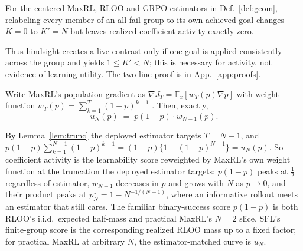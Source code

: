 \begin{lemma}
\label{lem:relabel}
For the centered MaxRL, RLOO and GRPO estimators in Def.~\ref{def:geom},
relabeling every member of an all-fail group to its own achieved goal changes
$K=0$ to $K'=N$ but leaves realized coefficient activity exactly zero.
\end{lemma}
\noindent
Thus hindsight creates a live contrast only if one goal is applied consistently
across the group and yields $1\le K'<N$; this is necessary for activity, not
evidence of learning utility. The two-line proof is in App.~\ref{app:proofs}.

\begin{corollary}
\label{cor:factor}
Write MaxRL's population gradient as $\nabla J_T=\mathbb E_x[w_T(p)\nabla p]$
with weight function $w_T(p)=\sum_{k=1}^{T}(1-p)^{k-1}$ \citep{maxrl}. Then,
exactly,
\[
u_N(p)\;=\;p(1-p)\cdot w_{N-1}(p).
\]
\end{corollary}
\noindent
By Lemma~\ref{lem:trunc} the deployed estimator targets $T=N-1$, and
$p(1-p)\sum_{k=1}^{N-1}(1-p)^{k-1}=(1-p)\{1-(1-p)^{N-1}\}=u_N(p)$. So
coefficient activity is the learnability score reweighted by MaxRL's own
weight function at the truncation the deployed estimator targets: $p(1-p)$
peaks at $\tfrac12$ regardless of estimator, $w_{N-1}$ decreases in $p$ and
grows with $N$ as $p\to0$, and their product peaks at
$p^\star_N=1-N^{-1/(N-1)}$, where an informative rollout meets an estimator
that still cares. The familiar binary-success score $p(1-p)$ is both RLOO's
i.i.d.\ expected half-mass and practical MaxRL's $N{=}2$ slice. SFL's
finite-group score is the corresponding realized RLOO mass up to a fixed
factor; for practical MaxRL at arbitrary $N$, the estimator-matched curve is
$u_N$.

